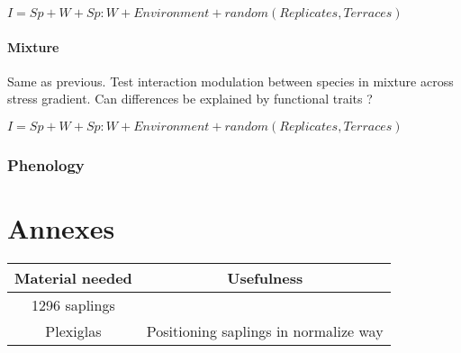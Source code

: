 \documentclass[12pt]{article} %
\begin{document}
$I= Sp + W + Sp:W + Environment + random(Replicates,Terraces)$

\paragraph{Mixture}
Same as previous. Test interaction modulation between species in mixture across stress gradient. Can differences be explained by functional traits ?

$I= Sp + W + Sp:W + Environment + random(Replicates,Terraces)$


\subsubsection{Phenology}




\begin{spacing}{1.0}

\end{spacing}

\section{Annexes}

\begin{table}
\begin{center}
\begin{tabular}{cc}
Material needed & Usefulness \\
\hline
1296 saplings & \\
Plexiglas & Positioning saplings in normalize way\\

\end{tabular}
\end{center}
\end{table}
\end{document}
